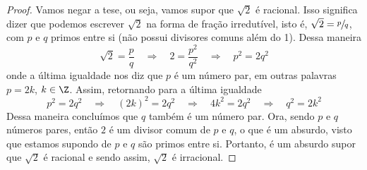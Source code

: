 \begin{proof}
  Vamos negar a tese, ou seja, vamos supor que $\sqrt{2}$ é racional. Isso
  significa dizer que podemos escrever $\sqrt{2}$ na forma de fração
  irredutível, isto é, $\sqrt{2}=\sfrac{p}{q}$, com $p$ e $q$ primos entre si
  (não possui divisores comuns além do 1). Dessa maneira
  \[
    \sqrt{2}=\frac{p}{q}
    \quad\Rightarrow\quad 2=\frac{p^2}{q^2}
    \quad\Rightarrow\quad p^2=2q^2
  \]
  onde a última igualdade nos diz que $p$ é um número par, em outras palavras
  $p=2k$, $k \in \Z$. Assim, retornando para a última igualdade
  \[
    p^2=2q^2
    \quad\Rightarrow\quad (2k)^2=2q^2
    \quad\Rightarrow\quad 4k^2=2q^2
    \quad\Rightarrow\quad q^2=2k^2
  \]
  Dessa maneira concluímos que $q$ também é um número par. Ora, sendo $p$ e $q$
  números pares, então $2$ é um divisor comum de $p$ e $q$, o que é um absurdo,
  visto que estamos supondo de $p$ e $q$ são primos entre si. Portanto, é um
  absurdo supor que $\sqrt{2}$ é racional e sendo assim, $\sqrt{2}$ é
  irracional.
\end{proof}

